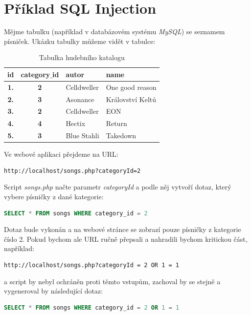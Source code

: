 \documentclass[12pt, a4paper]{report}
\begin{document}
\section{Příklad SQL Injection}
Mějme tabulku (například v databázovém systému \textit{MySQL}) se seznamem písniček. Ukázku tabulky můžeme vidět v tabulce:
\begin{table}[!h]
\centering
\begin{tabular}{|c|c|l|l|}
\hline
\bf id & \bf category$\_$id & \bf autor & \bf name \\
\hline
\hline
\bf 1. & \bf 2 & Celldweller & One good reason \\
\hline
\bf 2. & \bf 3 & Asonance & Království Keltů \\
\hline
\bf 3. & \bf 2 & Celldweller & EON \\
\hline
\bf 4. & \bf 4 & Hectix & Return \\
\hline
\bf 5. & \bf 3 & Blue Stahli & Takedown\\
\hline
\end{tabular}
\label{tab:hac}
\caption{Tabulka hudebního katalogu}
\end{table}
\newline
Ve webové aplikaci přejdeme na URL:
\begin{lstlisting}[label=web_app_url_1,language=HTML, caption=URL webové aplikace]
http://localhost/songs.php?categoryId=2
\end{lstlisting}

Script \textit{songs.php} načte parametr \textit{categoryId} a podle něj vytvoří dotaz, který vybere písničky z dané kategorie:

\begin{lstlisting}[label=web_app_url_2,language=SQL, caption=Vytvořený SQL dotaz]
SELECT * FROM songs WHERE category_id = 2
\end{lstlisting}

Dotaz bude vykonán a na webové stránce se zobrazí pouze písničky z kategorie číslo 2. Pokud bychom ale URL ručně přepsali a nahradili bychom kritickou část, například:
\begin{lstlisting}[label=web_app_url_3,language=HTML, caption=Ručně upravené URL]
http://localhost/songs.php?categoryId = 2 OR 1 = 1
\end{lstlisting}

a script by nebyl ochráněn proti těmto  vstupům, zachoval by se stejně a vygeneroval by následující dotaz:
\begin{lstlisting}[label=web_app_url_4,language=SQL, caption=Vygenerovaný SQL dotaz z upraveného URL]
SELECT * FROM songs WHERE category_id = 2 OR 1 = 1
\end{lstlisting}
\end{document}
